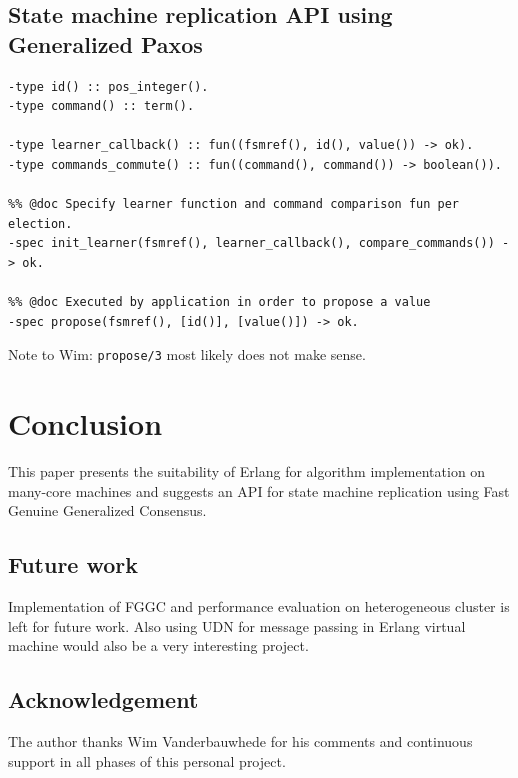 \documentclass[english,11pt]{article}
\newcommand{\fggc}{Fast Genuine Generalized Consensus}
\begin{document}
\subsection{State machine replication API using Generalized Paxos}

\begin{verbatim}
-type id() :: pos_integer().
-type command() :: term().

-type learner_callback() :: fun((fsmref(), id(), value()) -> ok).
-type commands_commute() :: fun((command(), command()) -> boolean()).

%% @doc Specify learner function and command comparison fun per election.
-spec init_learner(fsmref(), learner_callback(), compare_commands()) -> ok.

%% @doc Executed by application in order to propose a value
-spec propose(fsmref(), [id()], [value()]) -> ok.
\end{verbatim}

Note to Wim: {\tt propose/3} most likely does not make sense.

\section{Conclusion}
\label{sec:conclusion}

This paper presents the suitability of Erlang for algorithm implementation on
many-core machines and suggests an API for state machine replication using
\fggc.

\subsection{Future work}

Implementation of FGGC and performance evaluation on heterogeneous cluster is
left for future work. Also using UDN for message passing in Erlang virtual
machine would also be a very interesting project.

\subsection{Acknowledgement}

The author thanks Wim Vanderbauwhede for his comments and continuous support in
all phases of this personal project.
\end{document}
